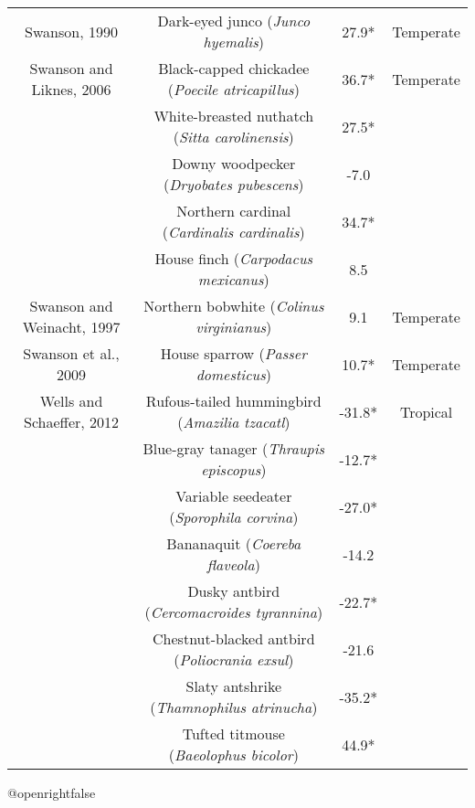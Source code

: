 \documentclass[10pt, twoside]{book} %
\begin{document}
\begin{table}[!ht]
\begin{adjustbox}{max width=\textwidth}
\begin{tabular}{cccc}
        Swanson, 1990 & Dark-eyed junco (\textit{Junco hyemalis}) & 27.9* & Temperate \\ 
        Swanson and Liknes, 2006 & Black-capped chickadee (\textit{Poecile atricapillus}) & 36.7* & Temperate \\ 
        ~ & White-breasted nuthatch (\textit{Sitta carolinensis}) & 27.5* & ~ \\ 
        ~ & Downy woodpecker (\textit{Dryobates pubescens}) & -7.0 & ~ \\ 
        ~ & Northern cardinal (\textit{Cardinalis cardinalis}) & 34.7* & ~ \\ 
        ~ & House finch (\textit{Carpodacus mexicanus}) & 8.5 & ~ \\ 
        Swanson and Weinacht, 1997 & Northern bobwhite (\textit{Colinus virginianus}) & 9.1 & Temperate \\ 
        Swanson et al., 2009 & House sparrow (\textit{Passer domesticus}) & 10.7* & Temperate \\ 
        Wells and Schaeffer, 2012 & Rufous-tailed hummingbird (\textit{Amazilia tzacatl}) & -31.8* & Tropical \\ 
        ~ & Blue-gray tanager (\textit{Thraupis episcopus}) & -12.7* & ~ \\ 
        ~ & Variable seedeater (\textit{Sporophila corvina}) & -27.0* & ~ \\ 
        ~ & Bananaquit (\textit{Coereba flaveola}) & -14.2 & ~ \\ 
        ~ & Dusky antbird (\textit{Cercomacroides tyrannina}) & -22.7* & ~ \\ 
        ~ & Chestnut-blacked antbird (\textit{Poliocrania exsul}) & -21.6 & ~ \\ 
        ~ & Slaty antshrike (\textit{Thamnophilus atrinucha}) & -35.2* & ~ \\ 
        ~ & Tufted titmouse (\textit{Baeolophus bicolor}) & 44.9* & ~ \\ \hline
    \end{tabular}
\end{adjustbox}
\end{table}





 \csname @openrightfalse\endcsname	
 \clearpage
 \thispagestyle{plain} %
 \backmatter
\end{document}
